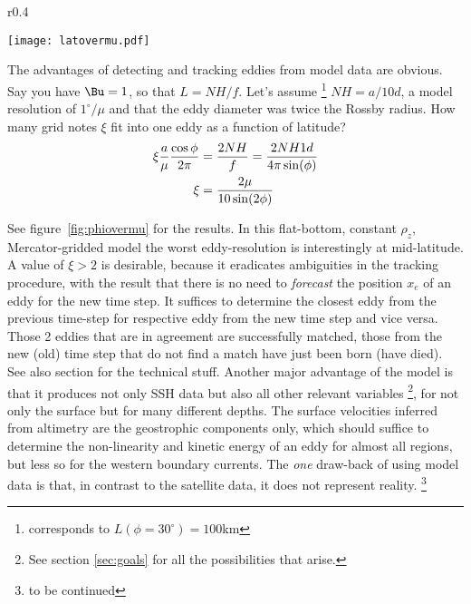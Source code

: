 \begin{wrapfigure}[20]{r}{0.4\textwidth}
\vspace{-5mm}
  \begin{center}
\texttt{[image: latovermu.pdf]}
 \end{center}
  \vspace{-3mm}
\caption{$\xi(\phi,\mu)$. $\mathrm{Ny}\equiv 2$ \ie the Nyquist frequency.}\label{fig:phiovermu}
\end{wrapfigure}
The advantages of detecting and tracking eddies from model data are obvious.
Say you have $\Bu=1$, so that $L=NH/f$. Let's assume \footnote{corresponds to $L(\phi=30^{\circ})=100$km} $NH=a/10d$, a model resolution of $1^{\circ}/\mu$ and that the eddy diameter was twice the Rossby radius. How many grid notes $\xi$ fit into one eddy as a function of latitude?
\begin{align}
	\xi \frac{a}{\mu} \frac{\cos \phi}{2 \pi}
	&=
	\frac{2NH }{f} = \frac{2NH 1d}{4 \pi  \sin(\phi)}\notag\\
	\xi
	&=
	 \frac{ 2\mu }{10  \sin(2\phi)}
\end{align}

See figure~\ref{fig:phiovermu} for the results. In this flat-bottom, constant $\rho_z$, Mercator-gridded model the worst eddy-resolution is interestingly at
mid-latitude. A value of $\xi>2$ is desirable, because it eradicates ambiguities in the tracking procedure, with the result that there is no need to
\textit{forecast} the position $x_e$ of an eddy for the new time step. It suffices to determine the closest eddy from the previous time-step for respective eddy
from the new time step and vice versa. Those 2 eddies that are in agreement are successfully matched, those from the new (old) time step that do not find a
match have just been born (have died). See also section  for the technical stuff.
Another major advantage of the model is that it produces not only SSH data but also all other relevant variables \footnote{See section \ref{sec:goals} for all the
possibilities that arise.}, for not only the surface but for many different depths. The surface velocities inferred from altimetry are the geostrophic
components only, which should suffice to \eg determine the non-linearity and kinetic energy of an eddy for almost all regions, but less so for \eg the western
boundary currents.
The \emph{one} draw-back of using model data is that, in contrast to the satellite data, it does not represent reality.
\footnote{to be continued}

